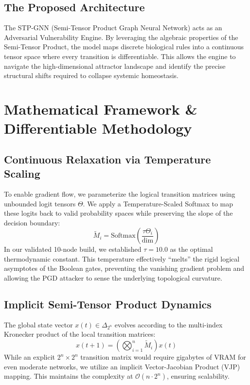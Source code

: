 \documentclass[11pt,a4paper]{article}
\begin{document}
\subsection{The Proposed Architecture}
The STP-GNN (Semi-Tensor Product Graph Neural Network) acts as an Adversarial Vulnerability Engine. By leveraging the algebraic properties of the Semi-Tensor Product, the model maps discrete biological rules into a continuous tensor space where every transition is differentiable. This allows the engine to navigate the high-dimensional attractor landscape and identify the precise structural shifts required to collapse systemic homeostasis.

\section{Mathematical Framework \& Differentiable Methodology}
\subsection{Continuous Relaxation via Temperature Scaling}
To enable gradient flow, we parameterize the logical transition matrices using unbounded logit tensors $\Theta$. We apply a Temperature-Scaled Softmax to map these logits back to valid probability spaces while preserving the slope of the decision boundary:
\begin{equation}
\tilde{M}_i = \text{Softmax}\left(\frac{\tau \Theta_i}{\text{dim}}\right)
\end{equation}
In our validated 10-node build, we established $\tau=10.0$ as the optimal thermodynamic constant. This temperature effectively ``melts'' the rigid logical asymptotes of the Boolean gates, preventing the vanishing gradient problem and allowing the PGD attacker to sense the underlying topological curvature.

\subsection{Implicit Semi-Tensor Product Dynamics}
The global state vector $x(t) \in \Delta_{2^n}$ evolves according to the multi-index Kronecker product of the local transition matrices:
\begin{equation}
x(t+1) = \left( \bigotimes_{i=1}^n \tilde{M}_i \right) x(t)
\end{equation}
While an explicit $2^n \times 2^n$ transition matrix would require gigabytes of VRAM for even moderate networks, we utilize an implicit Vector-Jacobian Product (VJP) mapping. This maintains the complexity at $\mathcal{O}(n \cdot 2^n)$, ensuring scalability.
\end{document}
